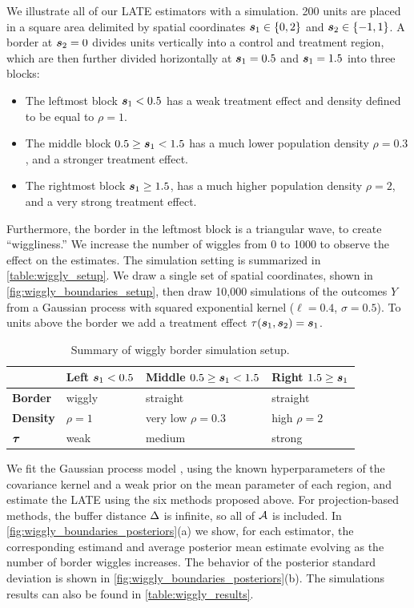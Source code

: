 	We illustrate all of our LATE estimators with a simulation.
200 units are placed in a square area delimited by spatial coordinates \(\bm{s}_1 \in \left\lbrace0,2\right\rbrace\) and \(\bm{s}_2 \in \left\lbrace-1, 1\right\rbrace\).
A border at \(\bm{s}_2=0\) divides units vertically into a control and treatment region,
which are then further divided horizontally at \(\bm{s}_1=0.5\) and \(\bm{s}_1=1.5\) into three blocks:
\begin{itemize}
\item
  The leftmost block \(\bm{s}_1 < 0.5\) has a weak treatment effect and density defined to be equal to \(\rho=1\).
\item
  The middle block \(0.5 \ge \bm{s}_1 < 1.5\) has a much lower population density \(\rho=0.3\), and a stronger treatment effect.
\item
  The rightmost block \(\bm{s}_1 \ge 1.5\), has a much higher population density \(\rho=2\), and a very strong treatment effect.
\end{itemize}
Furthermore, the border in the leftmost block is a triangular wave, to create ``wiggliness.''
We increase the number of wiggles from 0 to 1000 to observe the effect on the estimates.
The simulation setting is summarized in \autoref{table:wiggly_setup}.
We draw a single set of spatial coordinates, shown in \autoref{fig:wiggly_boundaries_setup}, then draw 10,000 simulations of the outcomes \(Y\) from a Gaussian process with squared exponential kernel (\(\ell=0.4\), \(\sigma=0.5\)).
To units above the border we add a treatment effect \(\tau(\bm{s}_1, \bm{s}_2) = \bm{s}_1\).



\begin{table}[tbp]
\centering
\bgroup
\def\arraystretch{1.1}%
\begin{tabular}{llll}
\hline
& Left \(\bm{s}_1< 0.5\) & Middle \(0.5 \ge \bm{s}_1 < 1.5\) & Right \(1.5 \ge \bm{s}_1\)\tabularnewline
\hline
\textbf{Border} & wiggly & straight & straight\tabularnewline
\textbf{Density} & \(\rho=1\) & very low \(\rho=0.3\) & high \(\rho=2\)\tabularnewline
\(\bm{\tau}\) & weak & medium & strong\tabularnewline
\hline
\end{tabular}
\egroup
\caption{
	Summary of wiggly border simulation setup. 
	\label{table:wiggly_setup}}
\end{table}

	We fit the Gaussian process model ,
using the known hyperparameters of the covariance kernel and a weak prior on the mean parameter of each region,
and estimate the LATE using the six methods proposed above.
For projection-based methods, the buffer distance \(\Delta\) is infinite, so all of \(\mathcal{A}\) is included.
In \autoref{fig:wiggly_boundaries_posteriors}(a) we show, for each estimator, the corresponding estimand and average posterior mean estimate evolving as the number of border wiggles increases.
The behavior of the posterior standard deviation is shown in \autoref{fig:wiggly_boundaries_posteriors}(b).
The simulations results can also be found in \autoref{table:wiggly_results}.




